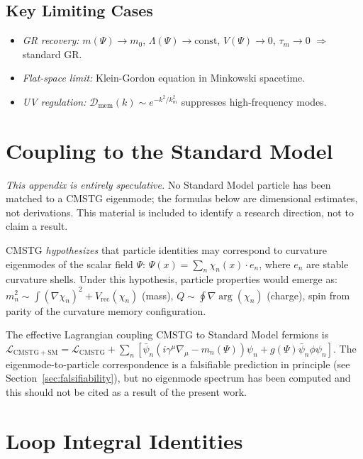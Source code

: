 \documentclass[12pt,a4paper]{article}
\begin{document}
\subsection{Key Limiting Cases}

\begin{itemize}
  \item \emph{GR recovery:} $m(\Psi)\to m_0$, $\Lambda(\Psi)\to\mathrm{const}$, $V(\Psi)\to 0$, $\tau_m\to 0$ $\Rightarrow$ standard GR.
  \item \emph{Flat-space limit:} Klein-Gordon equation in Minkowski spacetime.
  \item \emph{UV regulation:} $\mathcal{D}_{\mathrm{mem}}(k) \sim e^{-k^2/k_m^2}$ suppresses high-frequency modes.
\end{itemize}

\section{Coupling to the Standard Model}
\label{app:SM}

\emph{This appendix is entirely speculative.}  No Standard Model particle has
been matched to a CMSTG eigenmode; the formulas below are dimensional estimates,
not derivations.  This material is included to identify a research direction,
not to claim a result.

CMSTG \emph{hypothesizes} that particle identities may correspond to curvature
eigenmodes of the scalar field $\Psi$:
$\Psi(x) = \sum_n \chi_n(x)\cdot e_n$,
where $e_n$ are stable curvature shells. Under this hypothesis, particle
properties would emerge as:
$m_n^2 \sim \int (\nabla\chi_n)^2 + V_{\mathrm{rec}}(\chi_n)$ (mass),
$Q \sim \oint \nabla\arg(\chi_n)$ (charge),
spin from parity of the curvature memory configuration.

The effective Lagrangian coupling CMSTG to Standard Model fermions is
$\mathcal{L}_{\mathrm{CMSTG+SM}} = \mathcal{L}_{\mathrm{CMSTG}} + \sum_n[\bar\psi_n(i\gamma^\mu\nabla_\mu - m_n(\Psi))\psi_n + g(\Psi)\bar\psi_n\phi\psi_n]$.
The eigenmode-to-particle correspondence is a falsifiable prediction in principle
(see Section~\ref{sec:falsifiability}), but no eigenmode spectrum has been
computed and this should not be cited as a result of the present work.

\section{Loop Integral Identities}
\label{app:loop_integrals}
\end{document}
